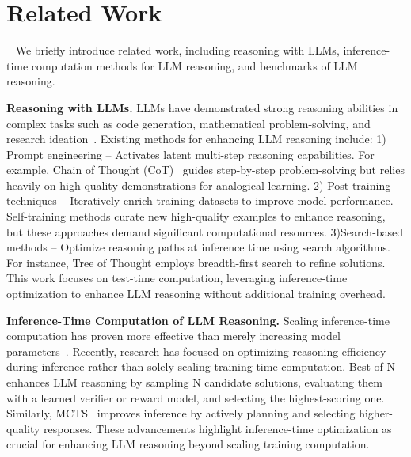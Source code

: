 \section{Related Work}
~\label{sec:relected_work}
We briefly introduce related work, including reasoning with LLMs, inference-time computation methods for LLM reasoning, and benchmarks of LLM reasoning.



\textbf{Reasoning with LLMs.}
LLMs have demonstrated strong reasoning abilities in complex tasks such as code generation, mathematical problem-solving, and research ideation~\cite{zhou2022least}. Existing methods for enhancing LLM reasoning include: 1) Prompt engineering – Activates latent multi-step reasoning capabilities. For example, Chain of Thought (CoT)~\cite{wei2022chain_cot} guides step-by-step problem-solving but relies heavily on high-quality demonstrations for analogical learning. 2) Post-training techniques\cite{chen2024bootstrapping, chen2024alphamath} – Iteratively enrich training datasets to improve model performance. Self-training methods\cite{chen2024bootstrapping} curate new high-quality examples to enhance reasoning, but these approaches demand significant computational resources. 3)Search-based methods\cite{browne2012survey, feng2023alphazero, liu2023making} – Optimize reasoning paths at inference time using search algorithms. For instance, Tree of Thought\cite{yao2024tree} employs breadth-first search to refine solutions.
This work focuses on test-time computation, leveraging inference-time optimization to enhance LLM reasoning without additional training overhead.


\textbf{Inference-Time Computation of LLM Reasoning.} Scaling inference-time computation has proven more effective than merely increasing model parameters~\cite{snell2024scaling}. Recently, research has focused on optimizing reasoning efficiency during inference rather than solely scaling training-time computation. Best-of-N~\cite{cobbe2021training_best_of_n} enhances LLM reasoning by sampling N candidate solutions, evaluating them with a learned verifier or reward model, and selecting the highest-scoring one. Similarly, MCTS~\cite{tian2024toward} improves inference by actively planning and selecting higher-quality responses. These advancements highlight inference-time optimization as crucial for enhancing LLM reasoning beyond scaling training computation.



